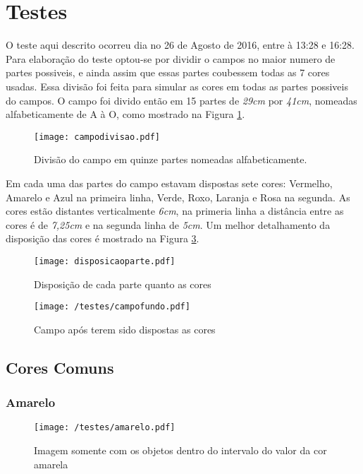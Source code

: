 \section{Testes}
O teste aqui descrito ocorreu dia no 26 de Agosto de 2016, entre à 13:28 e 16:28.
Para elaboração do teste optou-se por dividir o campos no maior numero de partes possiveis, e ainda assim que essas partes coubessem todas as 7 cores usadas. Essa divisão foi feita para simular as cores em todas as partes possiveis do campos. O campo foi divido então em 15 partes de \textit{29cm} por \textit{41cm}, nomeadas alfabeticamente de A à O, como mostrado na Figura \ref{campodivisao}.

\begin{figure}[H]
		\centering
		\texttt{[image: campodivisao.pdf]}
		\caption{Divisão do campo em quinze partes nomeadas alfabeticamente.}
		\label{campodivisao}
	\end{figure}
	
Em cada uma das partes do campo estavam dispostas sete cores: Vermelho, Amarelo e Azul na primeira linha, Verde, Roxo, Laranja e Rosa na segunda. As cores estão distantes verticalmente \textit{6cm}, na primeria linha a distância entre as cores é de \textit{7,25cm} e na segunda linha de \textit{5cm}. Um  melhor detalhamento da disposição das cores é mostrado na Figura \ref{disposicaoparte}.


\begin{figure}[H]
\begin{minipage}[b]{0.45\linewidth}
\centering
\texttt{[image: disposicaoparte.pdf]}
\caption{Disposição de cada parte quanto as cores}
\label{fig:figure1}
\end{minipage}
\hspace{0.5cm}
\begin{minipage}[b]{0.45\linewidth}
\centering
\texttt{[image: /testes/campofundo.pdf]}
\caption{Campo após terem sido dispostas as cores}
\label{fig:figure2}
\end{minipage}
\end{figure}

\subsection{Cores Comuns}
\subsubsection{Amarelo}
	\begin{figure}[H]
		\centering
		\texttt{[image: /testes/amarelo.pdf]}
		\caption{Imagem somente com os objetos dentro do intervalo do valor da cor amarela}
		\label{disposicaoparte}
	\end{figure}
	
